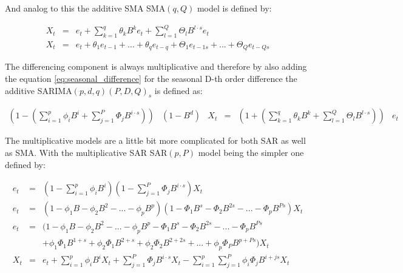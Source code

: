 And analog to this the additive \acl{SMA} \acs{SMA}$(q,Q)$ model is defined by:

\begin{equation}\label{eq:additive_SMA_q}
\begin{array}{rcl}
X_t & = & e_t + \displaystyle\sum_{k=1}^{q} \theta_k B^k e_t + \displaystyle\sum_{l=1}^{Q} \Theta_l B^{l\cdot s} e_t\\
X_t & = & e_t + \theta_1 e_{t-1}+ ... + \theta_q e_{t-q} + \Theta_1 e_{t-1 s}+ ... + \Theta_Q e_{t-Q s}
\end{array}   
\end{equation}

The differencing component is always multiplicative and therefore by also adding the equation \eqref{eq:seasonal_difference} for the seasonal D-th order difference the additive \acs{SARIMA}$(p,d,q)(P,D,Q)_s$ is defined as:

\begin{equation}\label{eq:additive_SARIMA}
\begin{array}{cccccc}
(1-(\displaystyle\sum_{i=1}^{p} \phi_i B^i + \displaystyle\sum_{j=1}^{P} \Phi_j B^{i\cdot s})) & (1-B^d)& X_t & = & (1+(\displaystyle\sum_{k=1}^{q} \theta_k B^k + \displaystyle\sum_{l=1}^{Q} \Theta_l B^{l\cdot s})) & e_t
\end{array}
\end{equation}

The multiplicative models are a little bit more complicated for both \acs{SAR} as well as \acs{SMA}. With the multiplicative \acl{SAR} \acs{SAR}$(p,P)$ model being the simpler one defined by:

\begin{equation}\label{eq:multiplicative_SAR_pP}
\begin{array}{rcl}
e_t & = & (1-\displaystyle\sum_{i=1}^{p} \phi_i B^i) (1-\displaystyle\sum_{j=1}^{P} \Phi_j B^{i\cdot s}) X_t\\
e_t & = & (1-\phi_1 B-\phi_2 B^2 - ... -\phi_p B^p) (1-\Phi_1 B^s-\Phi_2 B^{2s} - ... -\Phi_p B^{Ps}) X_t\\
e_t & = & (1-\phi_1 B-\phi_2 B^2 - ... -\phi_p B^p -\Phi_1 B^s-\Phi_2 B^{2s} - ... -\Phi_p B^{Ps} \\
& & + \phi_1 \Phi_1 B^{1+s} + \phi_2 \Phi_1 B^{2+s} + \phi_2 \Phi_2 B^{2+2s} + ... + \phi_p \Phi_P B^{p+Ps}) X_t\\
X_t & = & e_t + \displaystyle\sum_{i=1}^{p} \phi_i B^i X_t + \displaystyle\sum_{j=1}^{P} \Phi_j B^{i\cdot s} X_t - \displaystyle\sum_{i=1}^{p}\displaystyle\sum_{j=1}^{P} \phi_i \Phi_j B^{i + js} X_t
\end{array}  
\end{equation}

